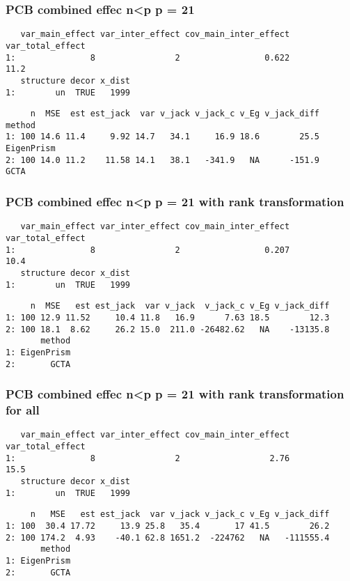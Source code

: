 \documentclass[]{article}
\begin{document}
\subsubsection{PCB combined effec n\textless{}p p =
21}\label{pcb-combined-effec-np-p-21}

\begin{verbatim}
   var_main_effect var_inter_effect cov_main_inter_effect var_total_effect
1:               8                2                 0.622             11.2
   structure decor x_dist
1:        un  TRUE   1999
\end{verbatim}

\begin{verbatim}
     n  MSE  est est_jack  var v_jack v_jack_c v_Eg v_jack_diff     method
1: 100 14.6 11.4     9.92 14.7   34.1     16.9 18.6        25.5 EigenPrism
2: 100 14.0 11.2    11.58 14.1   38.1   -341.9   NA      -151.9       GCTA
\end{verbatim}

\subsubsection{PCB combined effec n\textless{}p p = 21 with rank
transformation}\label{pcb-combined-effec-np-p-21-with-rank-transformation}

\begin{verbatim}
   var_main_effect var_inter_effect cov_main_inter_effect var_total_effect
1:               8                2                 0.207             10.4
   structure decor x_dist
1:        un  TRUE   1999
\end{verbatim}

\begin{verbatim}
     n  MSE   est est_jack  var v_jack  v_jack_c v_Eg v_jack_diff
1: 100 12.9 11.52     10.4 11.8   16.9      7.63 18.5        12.3
2: 100 18.1  8.62     26.2 15.0  211.0 -26482.62   NA    -13135.8
       method
1: EigenPrism
2:       GCTA
\end{verbatim}

\subsubsection{PCB combined effec n\textless{}p p = 21 with rank
transformation for
all}\label{pcb-combined-effec-np-p-21-with-rank-transformation-for-all}

\begin{verbatim}
   var_main_effect var_inter_effect cov_main_inter_effect var_total_effect
1:               8                2                  2.76             15.5
   structure decor x_dist
1:        un  TRUE   1999
\end{verbatim}

\begin{verbatim}
     n   MSE   est est_jack  var v_jack v_jack_c v_Eg v_jack_diff
1: 100  30.4 17.72     13.9 25.8   35.4       17 41.5        26.2
2: 100 174.2  4.93    -40.1 62.8 1651.2  -224762   NA   -111555.4
       method
1: EigenPrism
2:       GCTA
\end{verbatim}
\end{document}
